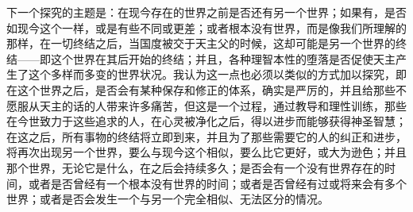 下一个探究的主题是：在现今存在的世界之前是否还有另一个世界；如果有，是否如现今这个一样，或是有些不同或更差；或者根本没有世界，而是像我们所理解的那样，在一切终结之后，当国度被交于天主父的时候，这却可能是另一个世界的终结——即这个世界在其后开始的终结；并且，各种理智本性的堕落是否促使天主产生了这个多样而多变的世界状况。我认为这一点也必须以类似的方式加以探究，即在这个世界之后，是否会有某种保存和修正的体系，确实是严厉的，并且给那些不愿服从天主的话的人带来许多痛苦，但这是一个过程，通过教导和理性训练，那些在今世致力于这些追求的人，在心灵被净化之后，得以进步而能够获得神圣智慧；在这之后，所有事物的终结将立即到来，并且为了那些需要它的人的纠正和进步，将再次出现另一个世界，要么与现今这个相似，要么比它更好，或大为逊色；并且那个世界，无论它是什么，在之后会持续多久；是否会有一个没有世界存在的时间，或者是否曾经有一个根本没有世界的时间；或者是否曾经有过或将来会有多个世界；或者是否会发生一个与另一个完全相似、无法区分的情况。\par

